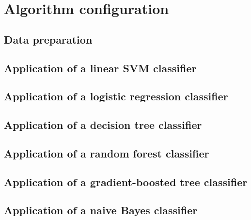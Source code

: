 \chapter{Algorithm configuration}
\section{Data preparation}
\section{Application of a linear SVM classifier}
\section{Application of a logistic regression classifier}
\section{Application of a decision tree classifier}
\section{Application of a random forest classifier}
\section{Application of a gradient-boosted tree classifier}
\section{Application of a naive Bayes classifier}